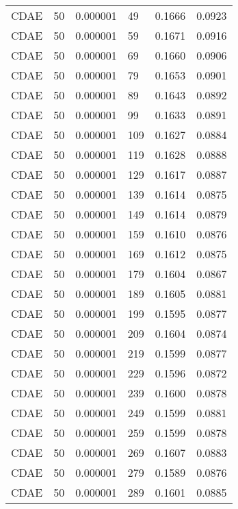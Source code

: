 \begin{tabular}{llrlrr}
    CDAE &   50 &  0.000001 &    49 &  0.1666 &       0.0923 \\
    CDAE &   50 &  0.000001 &    59 &  0.1671 &       0.0916 \\
    CDAE &   50 &  0.000001 &    69 &  0.1660 &       0.0906 \\
    CDAE &   50 &  0.000001 &    79 &  0.1653 &       0.0901 \\
    CDAE &   50 &  0.000001 &    89 &  0.1643 &       0.0892 \\
    CDAE &   50 &  0.000001 &    99 &  0.1633 &       0.0891 \\
    CDAE &   50 &  0.000001 &   109 &  0.1627 &       0.0884 \\
    CDAE &   50 &  0.000001 &   119 &  0.1628 &       0.0888 \\
    CDAE &   50 &  0.000001 &   129 &  0.1617 &       0.0887 \\
    CDAE &   50 &  0.000001 &   139 &  0.1614 &       0.0875 \\
    CDAE &   50 &  0.000001 &   149 &  0.1614 &       0.0879 \\
    CDAE &   50 &  0.000001 &   159 &  0.1610 &       0.0876 \\
    CDAE &   50 &  0.000001 &   169 &  0.1612 &       0.0875 \\
    CDAE &   50 &  0.000001 &   179 &  0.1604 &       0.0867 \\
    CDAE &   50 &  0.000001 &   189 &  0.1605 &       0.0881 \\
    CDAE &   50 &  0.000001 &   199 &  0.1595 &       0.0877 \\
    CDAE &   50 &  0.000001 &   209 &  0.1604 &       0.0874 \\
    CDAE &   50 &  0.000001 &   219 &  0.1599 &       0.0877 \\
    CDAE &   50 &  0.000001 &   229 &  0.1596 &       0.0872 \\
    CDAE &   50 &  0.000001 &   239 &  0.1600 &       0.0878 \\
    CDAE &   50 &  0.000001 &   249 &  0.1599 &       0.0881 \\
    CDAE &   50 &  0.000001 &   259 &  0.1599 &       0.0878 \\
    CDAE &   50 &  0.000001 &   269 &  0.1607 &       0.0883 \\
    CDAE &   50 &  0.000001 &   279 &  0.1589 &       0.0876 \\
    CDAE &   50 &  0.000001 &   289 &  0.1601 &       0.0885 \\

\end{tabular}
